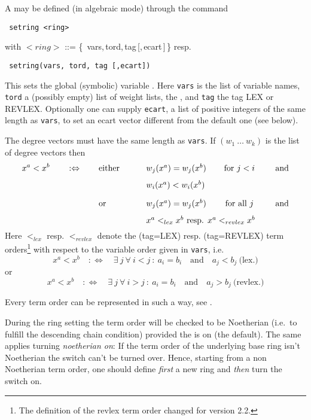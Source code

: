 A  may be defined (in algebraic mode) through the
command 
\begin{verbatim}
 setring <ring>
\end{verbatim}
with $<ring>$ ::= \{\, vars,\,tord,\,tag\,[,\,ecart\,]\,\} resp.
\begin{verbatim}
 setring(vars, tord, tag [,ecart])
\end{verbatim}
This sets the global (symbolic) variable . Here
{\tt vars} is the list of variable names, {\tt tord} a (possibly
empty) list of weight lists, the , and {\tt tag}
the tag LEX or REVLEX. Optionally one can supply {\tt ecart}, a list 
of positive integers of the same length as {\tt vars}, to set an ecart
vector different from the default one (see below).

The degree vectors must have the same length as {\tt vars}. If $(w_1\
\ldots\ w_k)$ is the list of degree vectors then 
\[x^a<x^b \qquad :\Leftrightarrow \qquad 
\parbox[t]{8cm}{either\hfill 
\parbox[t]{6cm}{$w_j(x^a)=w_j(x^b)$\hfill for $j<i$ \hfill and \\[8pt]
$w_i(x^a)<w_i(x^b)$} \\[10pt] or\hfill 
\parbox[t]{6cm}{$w_j(x^a)=w_j(x^b)$\hfill for all $j$ \hfill and \\[8pt]
$x^a<_{lex}x^b$ resp. $x^a<_{revlex}x^b$}}
\]
Here $<_{lex}$ resp. $<_{revlex}$ denote the
 (tag=LEX) resp. 
(tag=REVLEX) term orders\footnote{The definition of the revlex term
order changed for version 2.2.}
with respect to the variable order given in {\tt vars}, i.e.\ 
\[x^a<x^b \quad :\Leftrightarrow \quad 
\exists\ j\ \forall\ i<j\ :\ a_i=b_i\quad\mbox{and}\quad a_j<b_j\
\mbox{(lex.)}\]
or 
\[x^a<x^b \quad :\Leftrightarrow \quad 
\exists\ j\ \forall\ i>j\ :\ a_i=b_i\quad\mbox{and}\quad a_j>b_j\
\mbox{(revlex.)}\]

Every term order can be represented in such a way, see \cite{MR88}.

During the ring setting the term order will be checked to be
Noetherian (i.e.\ to fulfill the descending chain condition) provided
the \ind{switch Noetherian} is on (the default). The same applies
turning {\em noetherian on}: If the term order of the underlying
base ring isn't Noetherian the switch can't be turned over. Hence,
starting from a non Noetherian term order, one should define {\em
first} a new ring and {\em then} turn the switch on. 

